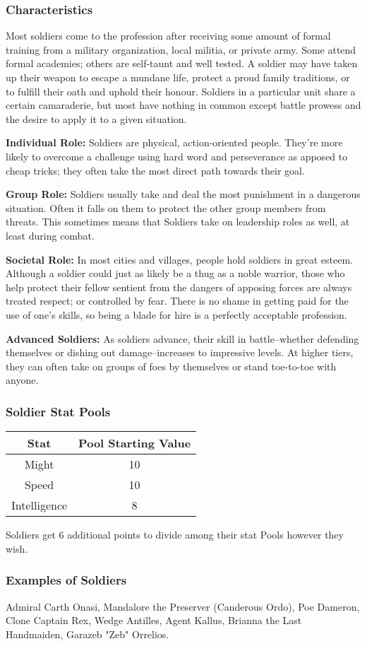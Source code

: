 \documentclass[a4paper,10pt,final,twocolumn,oneside]{book}
\newcommand{\statPool}[5]
{
	\subsubsection*{#1 Stat Pools}
	\label{subsub:#1StatPools}
	\begin{center}
	\begin{tabular}{ |c|c| }
	\hline
	\textbf{Stat} & \textbf{Pool Starting Value} \\
	\hline \hline
	Might & #2 \\
	\hline
 	Speed & #3  \\
 	\hline
 	Intelligence & #4  \\
 	\hline
	\end{tabular}
	\end{center}
	#1s get #5 additional points to divide among their stat Pools however they wish.
}
\newcommand{\itemLine}[2]{\textbf{#1:}{ #2}\par}
\begin{document}
\subsubsection*{Characteristics}
\label{subsub:soldierCharacteristics}

Most soldiers come to the profession after receiving some amount of formal training from a military organization, local militia, or private army. Some attend formal academies; others are self-taunt and well tested. A soldier may have taken up their weapon to escape a mundane life, protect a proud family traditions, or to fulfill their oath and uphold their honour. Soldiers in a particular unit share a certain camaraderie, but most have nothing in common except battle prowess and the desire to apply it to a given situation.

\itemLine{Individual Role}{Soldiers are physical, action-oriented people. They're more likely to overcome a challenge using hard word and perseverance as apposed to cheap tricks; they often take the most direct path towards their goal.}

\itemLine{Group Role}{Soldiers usually take and deal the most punishment in a dangerous situation. Often it falls on them to protect the other group members from threats. This sometimes means that Soldiers take on leadership roles as well, at least during combat.}

\itemLine{Societal Role}{In most cities and villages, people hold soldiers in great esteem. Although a soldier could just as likely be a thug as a noble warrior, those who help protect their fellow sentient from the dangers of apposing forces are always treated respect; or controlled by fear. There is no shame in getting paid for the use of one’s skills, so being a blade for hire is a perfectly acceptable profession.}

\itemLine{Advanced Soldiers}{As soldiers advance, their skill in battle--whether defending themselves or dishing out damage--increases to impressive levels. At higher tiers, they can often take on groups of foes by themselves or stand toe-to-toe with anyone.}

\statPool{Soldier}{10}{10}{8}{6}

\subsubsection*{Examples of Soldiers}
\label{subsub:soldierExamples}

Admiral Carth Onasi, Mandalore the Preserver (Canderous Ordo), Poe Dameron, Clone Captain Rex, Wedge Antilles, Agent Kallus, Brianna the Last Handmaiden, Garazeb "Zeb" Orrelios.
\end{document}
